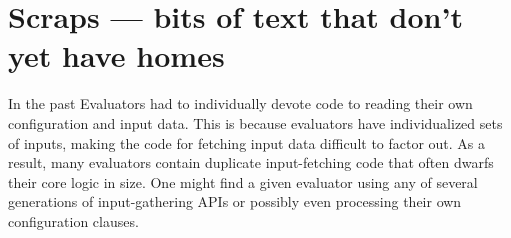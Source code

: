 \documentclass{article}
\begin{document}
\section{Scraps --- bits of text that don't yet have homes} %

In the past Evaluators had to individually devote code to reading their own configuration and input data.
This is because evaluators have individualized sets of inputs, making the code for fetching input data difficult to factor out.
As a result, many evaluators contain duplicate input-fetching code that often dwarfs their core logic in size.
One might find a given evaluator using any of several generations of input-gathering APIs or possibly even processing their own configuration clauses.



\end{document}
